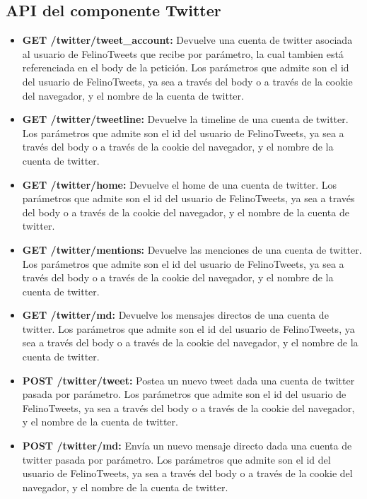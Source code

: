 \documentclass[a4paper]{article}
\begin{document}
	\subsection{API del componente Twitter}
	\begin{itemize}
		\item \textbf{GET /twitter/tweet\_account:} Devuelve una cuenta de twitter asociada al usuario de FelinoTweets que recibe por parámetro, la cual tambien está referenciada en el body de la petición. Los parámetros que admite son el id del usuario de FelinoTweets, ya sea a través del body o a través de la cookie del navegador, y el nombre de la cuenta de twitter.
		
		\item \textbf{GET /twitter/tweetline:} Devuelve la timeline de una cuenta de twitter. Los parámetros que admite son el id del usuario de FelinoTweets, ya sea a través del body o a través de la cookie del navegador, y el nombre de la cuenta de twitter.
		
		\item \textbf{GET /twitter/home:} Devuelve el home de una cuenta de twitter. Los parámetros que admite son el id del usuario de FelinoTweets, ya sea a través del body o a través de la cookie del navegador, y el nombre de la cuenta de twitter.
		
		\item \textbf{GET /twitter/mentions:} Devuelve las menciones de una cuenta de twitter. Los parámetros que admite son el id del usuario de FelinoTweets, ya sea a través del body o a través de la cookie del navegador, y el nombre de la cuenta de twitter.
		
		\item \textbf{GET /twitter/md:} Devuelve los mensajes directos de una cuenta de twitter. Los parámetros que admite son el id del usuario de FelinoTweets, ya sea a través del body o a través de la cookie del navegador, y el nombre de la cuenta de twitter.
		
		\item \textbf{POST /twitter/tweet:} Postea un nuevo tweet dada una cuenta de twitter pasada por parámetro. Los parámetros que admite son el id del usuario de FelinoTweets, ya sea a través del body o a través de la cookie del navegador, y el nombre de la cuenta de twitter.
		
		\item \textbf{POST /twitter/md:} Envía un nuevo mensaje directo dada una cuenta de twitter pasada por parámetro. Los parámetros que admite son el id del usuario de FelinoTweets, ya sea a través del body o a través de la cookie del navegador, y el nombre de la cuenta de twitter.
		

\end{itemize}
\end{document}
